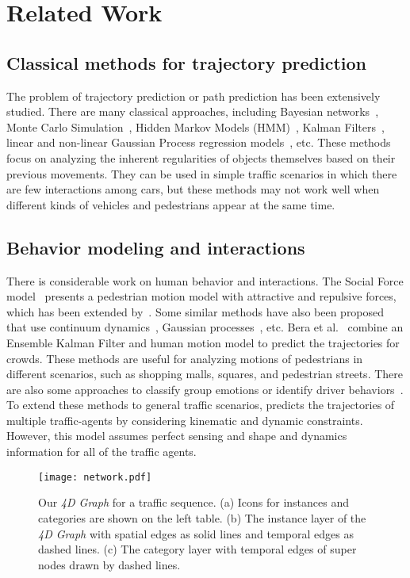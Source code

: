 \documentclass[letterpaper]{article} \usepackage{aaai19}  \usepackage{times}  \usepackage{helvet}  \usepackage{courier}  \usepackage{url}  \usepackage{graphicx}  \usepackage{amsmath}
\begin{document}
\section{Related Work}

\subsection{Classical methods for trajectory prediction}
The problem of trajectory prediction or path prediction has been extensively studied. There are many classical approaches, including Bayesian networks~\cite{lefevre2011exploiting}, Monte Carlo Simulation~\cite{danielsson2007monte}, Hidden Markov Models (HMM)~\cite{firl2012predictive}, Kalman
Filters~\cite{kalman1960new}, linear and non-linear Gaussian Process regression models~\cite{rasmussen2006gaussian}, etc. These methods focus on analyzing the inherent regularities of objects themselves based on their previous movements. They can be used in simple traffic scenarios in which there are few interactions among cars, but these methods may not work well when different kinds of vehicles and pedestrians appear at the same time. 

\subsection{Behavior modeling and interactions}
There is considerable work on human behavior and interactions. The Social Force model~\cite{helbing1995social} presents a pedestrian motion model with attractive and repulsive forces, which has been  extended by~\cite{yamaguchi2011you}. Some similar methods have also been proposed that use continuum dynamics~\cite{treuille2006continuum}, Gaussian processes~\cite{wang2008gaussian}, etc. Bera et al.~ combine an Ensemble Kalman Filter and human motion model to predict the trajectories for crowds. These methods are useful for analyzing motions of pedestrians in different scenarios, such as shopping malls, squares, and pedestrian streets. There are also some approaches to classify group emotions or identify driver behaviors~\cite{cheung2018identifying}. To extend these methods to general traffic scenarios, \cite{ma2018autorvo} predicts the trajectories of multiple traffic-agents by considering kinematic and dynamic constraints. However, this model assumes perfect sensing and shape and dynamics information for all of the traffic agents. 

\begin{figure*}
\texttt{[image: network.pdf]}
\caption{Our \textit{4D Graph} for a traffic sequence. (a) Icons for instances and categories are shown on the left table. (b) The instance layer of the \textit{4D Graph} with spatial edges as solid lines and temporal edges as dashed lines. (c) The category layer with temporal edges of super nodes drawn by dashed lines. }
\label{fig:network}
\vspace{-3ex}
\end{figure*}
\end{document}

